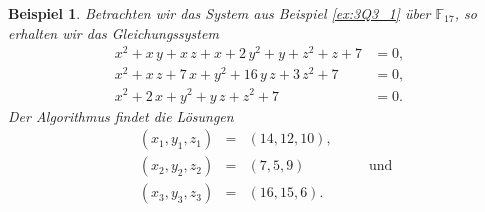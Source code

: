 \documentclass[a4paper,oneside, 11pt, openany%
]{article}
\newcommand{\F}[1]{\mathbb{F}_{#1}}
\theoremstyle{custom}
\theoremstyle{custom}
\newtheorem{example}{Beispiel}[section]
\begin{document}
	\begin{example}
		Betrachten wir das System aus Beispiel {\normalfont\ref{ex:3Q3_1}} über $\F{17}$, so erhalten wir das Gleichungssystem
		\begin{equation*}
			\begin{alignedat}{-1}
				     x^2+x\,y+x\,z+x+2\,y^2+y+z^2+z+7&=0,\\
				      x^2+x\,z+7\,x+y^2+16\,y\,z+3\,z^2+7&=0,\\
				       x^2+2\,x+y^2+y\,z+z^2+7&=0.
		\end{alignedat}
		\end{equation*}
		Der Algorithmus findet die Lösungen
		\begin{equation*}
			\begin{alignedat}{5}
				&\left( x_{1},y_{1},z_{1}\right) &=& \left(14,12,10 \right),&&\\
				&\left( x_{2},y_{2},z_{2}\right) &=& \left(7,5,9 \right)&& \quad\text{und} \\
				&\left( x_{3},y_{3},z_{3}\right) &=& \left(16,15,6 \right).&&
			\end{alignedat}
		\end{equation*}
	\end{example}
\end{document}
